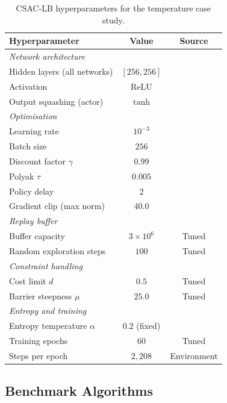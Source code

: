 \begin{table}[htbp]
\centering
\caption{CSAC-LB hyperparameters for the temperature case study.}
\label{tab:csac-hyperparams}
\begin{tabular}{lcc}
\toprule
\textbf{Hyperparameter} & \textbf{Value} & \textbf{Source} \\
\midrule
\multicolumn{3}{l}{\textit{Network architecture}} \\
Hidden layers (all networks) & $[256, 256]$ & \cite{zhang2024csaclb} \\
Activation & ReLU & \cite{zhang2024csaclb} \\
Output squashing (actor) & $\tanh$ & \cite{haarnoja2018sac} \\
\midrule
\multicolumn{3}{l}{\textit{Optimisation}} \\
Learning rate & $10^{-3}$ & \cite{zhang2024csaclb} \\
Batch size & $256$ & \cite{zhang2024csaclb} \\
Discount factor $\gamma$ & $0.99$ & \cite{zhang2024csaclb} \\
Polyak $\tau$ & $0.005$ & \cite{zhang2024csaclb} \\
Policy delay & $2$ & \cite{zhang2024csaclb} \\
Gradient clip (max norm) & $40.0$ & \cite{zhang2024csaclb} \\
\midrule
\multicolumn{3}{l}{\textit{Replay buffer}} \\
Buffer capacity & $3 \times 10^6$ & Tuned \\
Random exploration steps & $100$ & Tuned \\
\midrule
\multicolumn{3}{l}{\textit{Constraint handling}} \\
Cost limit $d$ & $0.5$ & Tuned \\
Barrier steepness $\mu$ & $25.0$ & Tuned \\
\midrule
\multicolumn{3}{l}{\textit{Entropy and training}} \\
Entropy temperature $\alpha$ & $0.2$ (fixed) & \cite{zhang2024csaclb} \\
Training epochs & $60$ & Tuned \\
Steps per epoch & $2{,}208$ & Environment \\
\bottomrule
\end{tabular}
\end{table}


\subsection{Benchmark Algorithms}
\label{sec:temp-benchmark-algos}

